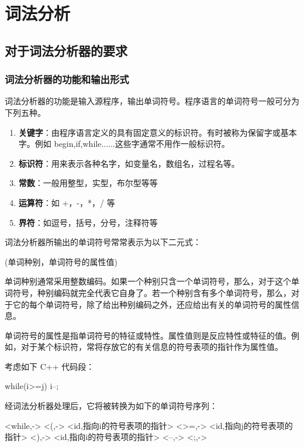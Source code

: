 \section{词法分析}
\subsection{对于词法分析器的要求}
\subsubsection{词法分析器的功能和输出形式}

词法分析器的功能是输入源程序，输出单词符号。程序语言的单词符号一般可分为下列五种。

\begin{enumerate}
    \item \textbf{关键字}：由程序语言定义的具有固定意义的标识符。有时被称为保留字或基本字。例如 begin,if,while......这些字通常不用作一般标识符。
    \item \textbf{标识符}：用来表示各种名字，如变量名，数组名，过程名等。
    \item \textbf{常数}：一般用整型，实型，布尔型等等
    \item \textbf{运算符}：如 +，-，*，/ 等
    \item \textbf{界符}：如逗号，括号，分号，注释符等
\end{enumerate}

词法分析器所输出的单词符号常常表示为以下二元式：
\begin{center}
    (单词种别，单词符号的属性值)
\end{center}

单词种别通常采用整数编码。如果一个种别只含一个单词符号，那么，对于这个单词符号，种别编码就完全代表它自身了。若一个种别含有多个单词符号，那么，对于它的每个单词符号，除了给出种别编码之外，还应给出有关的单词符号的属性信息。

单词符号的属性是指单词符号的特征或特性。属性值则是反应特性或特征的值。例如，对于某个标识符，常将存放它的有关信息的符号表项的指针作为属性值。

考虑如下 C++ 代码段：
\begin{center}
    while(i>=j) i--;
\end{center}

经词法分析器处理后，它将被转换为如下的单词符号序列：
\begin{center}
    \begin{code}
        <while,->
        <(,->
        <id,指向i的符号表项的指针>
        <>=,->
        <id,指向j的符号表项的指针>
        <),->
        <id,指向i的符号表项的指针>
        <--,->
        <;,->
    \end{code}
\end{center}

